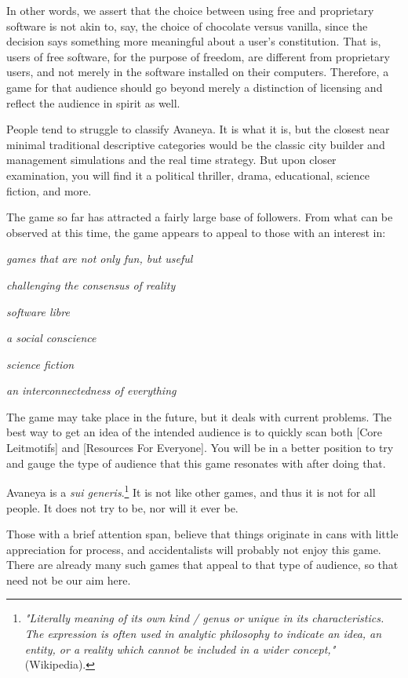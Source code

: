 In other words, we assert that the choice between using free and proprietary software is not akin to, say, the choice of chocolate versus vanilla, since the decision says something more meaningful about a user's constitution. That is, users of free software, for the purpose of freedom, are different from proprietary users, and not merely in the software installed on their computers. Therefore, a game for that audience should go beyond merely a distinction of licensing and reflect the audience in spirit as well.

People tend to struggle to classify Avaneya. It is what it is, but the closest near minimal traditional descriptive categories would be the classic city builder and management simulations and the real time strategy. But upon closer examination, you will find it a political thriller, drama, educational, science fiction, and more.

The game so far has attracted a fairly large base of followers. From what can be observed at this time, the game appears to appeal to those with an interest in:

\startitemize[3]
\item
{\it games that are not only fun, but useful}
\item
{\it challenging the consensus of reality}
\item
{\it software libre}
\item
{\it a social conscience}
\item
{\it science fiction}
\item
{\it an interconnectedness of everything}
\stopitemize

The game may take place in the future, but it deals with current problems. The best way to get an idea of the intended audience is to quickly scan both [Core Leitmotifs] and [Resources For Everyone]. You will be in a better position to try and gauge the type of audience that this game resonates with after doing that. 

Avaneya is a {\it sui generis}.\footnote{{\it "Literally meaning of its own kind / genus or unique in its characteristics. The expression is often used in analytic philosophy to indicate an idea, an entity, or a reality which cannot be included in a wider concept,"} (Wikipedia).} It is not like other games, and thus it is not for all people. It does not try to be, nor will it ever be.

Those with a brief attention span, believe that things originate in cans with little appreciation for process, and accidentalists will probably not enjoy this game. There are already many such games that appeal to that type of audience, so that need not be our aim here.

